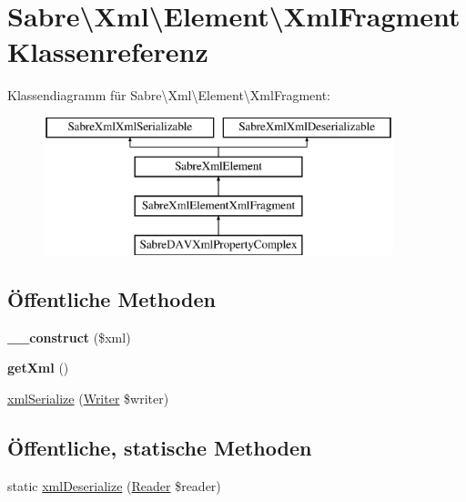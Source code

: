 \hypertarget{class_sabre_1_1_xml_1_1_element_1_1_xml_fragment}{}\section{Sabre\textbackslash{}Xml\textbackslash{}Element\textbackslash{}Xml\+Fragment Klassenreferenz}
\label{class_sabre_1_1_xml_1_1_element_1_1_xml_fragment}
Klassendiagramm für Sabre\textbackslash{}Xml\textbackslash{}Element\textbackslash{}Xml\+Fragment\+:\begin{figure}[H]
\begin{center}
\leavevmode
\includegraphics[height=4.000000cm]{class_sabre_1_1_xml_1_1_element_1_1_xml_fragment}
\end{center}
\end{figure}
\subsection*{Öffentliche Methoden}
\begin{DoxyCompactItemize}
\item 
\mbox{\label{class_sabre_1_1_xml_1_1_element_1_1_xml_fragment_a1c7df4a62d2e9de7c79105f2f5aadd03}} 
{\bfseries \+\_\+\+\_\+construct} (\$xml)
\item 
\mbox{\label{class_sabre_1_1_xml_1_1_element_1_1_xml_fragment_ad17571d9032b11ae10c90b8e39e65a82}} 
{\bfseries get\+Xml} ()
\item 
\mbox{\hyperlink{class_sabre_1_1_xml_1_1_element_1_1_xml_fragment_af7abb5c313d08e5ee12a4dfa37be6b2c}{xml\+Serialize}} (\mbox{\hyperlink{class_sabre_1_1_xml_1_1_writer}{Writer}} \$writer)
\end{DoxyCompactItemize}
\subsection*{Öffentliche, statische Methoden}
\begin{DoxyCompactItemize}
\item 
static \mbox{\hyperlink{class_sabre_1_1_xml_1_1_element_1_1_xml_fragment_a91fd5741f54051de0eeb6779d7d7917f}{xml\+Deserialize}} (\mbox{\hyperlink{class_sabre_1_1_xml_1_1_reader}{Reader}} \$reader)
\end{DoxyCompactItemize}
